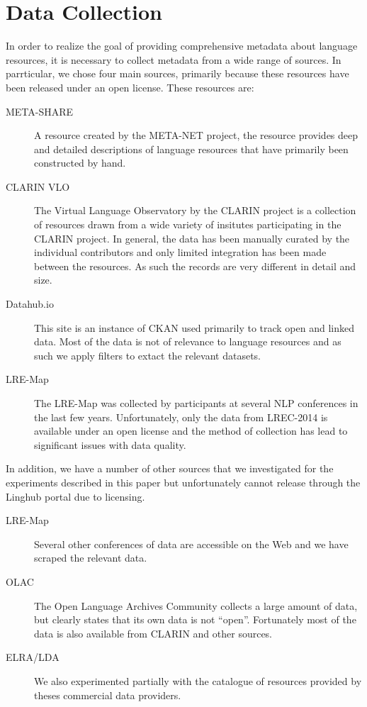 \documentclass[smallextended]{svjour3}       %
\begin{document}
\section{Data Collection}
\label{data-collection}

In order to realize the goal of providing comprehensive metadata about language
resources, it is necessary to collect metadata from a wide range of sources. In
parrticular, we chose four main sources, primarily because these resources have
been released under an open license. These resources are:

\begin{description}
    \item[META-SHARE] A resource created by the META-NET project,  the resource
        provides deep and detailed descriptions of language resources that have
        primarily been constructed by hand.
    \item[CLARIN VLO] The Virtual Language Observatory by the CLARIN project is
        a collection of resources drawn from a wide variety of insitutes
        participating in the CLARIN project. In general, the data has been
        manually curated by the individual contributors and only limited
        integration has been made between the resources. As such the records are
        very different in detail and size.
    \item[Datahub.io] This site is an instance of CKAN used primarily to track
        open and linked data. Most of the data is not of relevance to language
        resources and as such we apply filters to extact the relevant datasets.
    \item[LRE-Map] The LRE-Map was collected by participants at several NLP
        conferences in the last few years. Unfortunately, only the data from
        LREC-2014 is available under an open license and the method of collection has
        lead to significant issues with data quality.
\end{description}

In addition, we have a number of other sources that we investigated for the
experiments described in this paper but unfortunately cannot release through the
Linghub portal due to licensing.

\begin{description}
    \item[LRE-Map] Several other conferences of data are accessible on the Web
        and we have scraped the relevant data.
    \item[OLAC] The Open Language Archives Community collects a large amount of
        data, but clearly states that its own data is not ``open''. Fortunately
        most of the data is also available from CLARIN and other sources.
    \item[ELRA/LDA] We also experimented partially with the catalogue of
        resources provided by theses commercial data providers.
\end{description}
\end{document}
